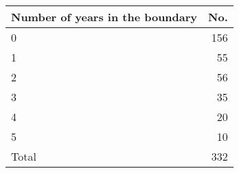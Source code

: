 \documentclass{article}
\begin{document}
\begin{tabular}{lr}
\hline
Number of years in the boundary&No. \\
\midrule
0&156 \\
1&55 \\
2&56 \\
3&35 \\
4&20 \\
5&10 \\
Total&332 \\
\hline
\end{tabular}
\end{document}
